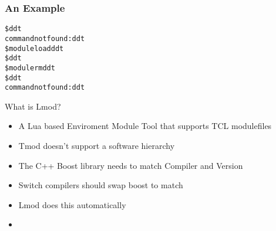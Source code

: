 \documentclass{beamer}
\begin{document}
\begin{frame}[fragile]
    \frametitle{An Example}
    {\small
      \begin{alltt}
          \$ {\color{blue} ddt}
          command not found: ddt
          \$ {\color{blue} module load ddt}
          \$ {\color{blue} ddt }
          \$ {\color{blue} module rm ddt}
          \$ {\color{blue} ddt}
          command not found: ddt
      \end{alltt}
    }
\end{frame}    

\begin{frame}{What is Lmod?}
  \begin{itemize}
    \item A Lua based Enviroment Module Tool that supports TCL modulefiles
    \item Tmod doesn't support a software hierarchy
    \item The C++ Boost library needs to match Compiler and Version
    \item Switch compilers should swap boost to match
    \item Lmod does this automatically
  \end{itemize}
\end{frame}

\begin{frame}{ }
  \begin{itemize}
    \item 
  \end{itemize}
\end{frame}
\end{document}

